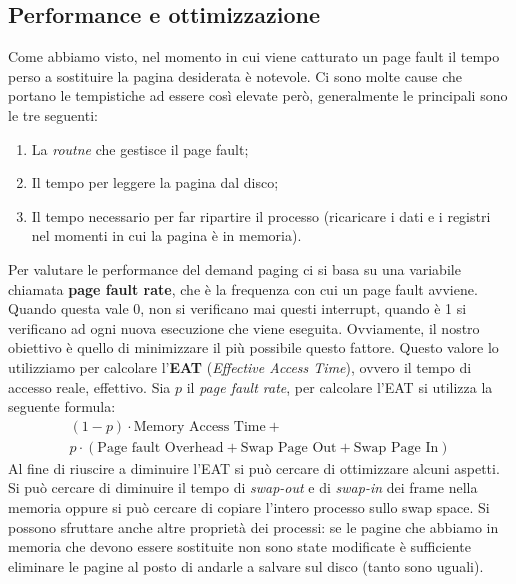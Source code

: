 \subsection{Performance e ottimizzazione}
Come abbiamo visto, nel momento in cui viene catturato un page fault il tempo perso a sostituire la pagina desiderata è notevole. Ci sono molte cause che portano le tempistiche ad essere così elevate però, generalmente le principali sono le tre seguenti:
\vspace{-5px}
\begin{enumerate}
\setlength{\itemsep}{-.25 em}
    \item La \textit{routne} che gestisce il page fault;
    \item Il tempo per leggere la pagina dal disco;
    \item Il tempo necessario per far ripartire il processo (ricaricare i dati e i registri nel momenti in cui la pagina è in memoria).
\end{enumerate}
Per valutare le performance del demand paging ci si basa su una variabile chiamata \textbf{page fault rate}, che è la frequenza con cui un page fault avviene. Quando questa vale 0, non si verificano mai questi interrupt, quando è 1 si verificano ad ogni nuova esecuzione che viene eseguita. Ovviamente, il nostro obiettivo è quello di minimizzare il più possibile questo fattore. Questo valore lo utilizziamo per calcolare l'\textbf{EAT} (\textit{Effective Access Time}), ovvero il tempo di accesso reale, effettivo. Sia $p$ il \textit{page fault rate}, per calcolare l'EAT si utilizza la seguente formula:
\begin{gather*}
    (1-p)\cdot\text{Memory Access Time} + \\  p\cdot(\text{Page fault Overhead} + \text{Swap Page Out} + \text{Swap Page In})
\end{gather*}
Al fine di riuscire a diminuire l'EAT si può cercare di ottimizzare alcuni aspetti. Si può cercare di diminuire il tempo di \textit{swap-out} e di \textit{swap-in} dei frame nella memoria oppure si può cercare di copiare l'intero processo sullo swap space. Si possono sfruttare anche altre proprietà dei processi: se le pagine che abbiamo in memoria che devono essere sostituite non sono state modificate è sufficiente eliminare le pagine al posto di andarle a salvare sul disco (tanto sono uguali). 

